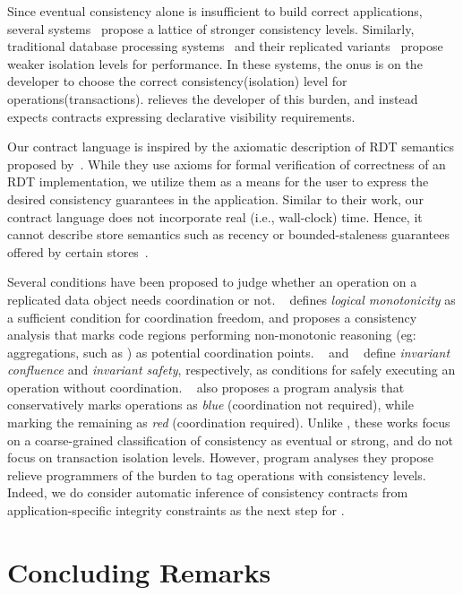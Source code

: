 Since eventual consistency alone is insufficient to build correct applications,
several systems~\cite{Bayou,Terry2013,RedBlue} propose a lattice of stronger
consistency levels. Similarly, traditional database processing
systems~\cite{Berenson95} and their replicated variants~\cite{BailisHAT}
propose weaker isolation levels for performance. In these systems, the onus is
on the developer to choose the correct consistency(isolation) level for
operations(transactions). \quelea relieves the developer of this burden, and
instead expects contracts expressing declarative visibility requirements.

Our contract language is inspired by the axiomatic description of RDT semantics
proposed by~\cite{Burckhardt2014}. While they use axioms for formal
verification of correctness of an RDT implementation, we utilize them as a
means for the user to express the desired consistency guarantees in the
application. Similar to their work, our contract language does not incorporate
real (i.e., wall-clock) time. Hence, it cannot describe store semantics such as
recency or bounded-staleness guarantees offered by certain
stores~\cite{Terry2013}.

Several conditions have been proposed to judge whether an operation on a
replicated data object needs coordination or not. ~\cite{Calm} defines
\emph{logical monotonicity} as a sufficient condition for coordination freedom,
and proposes a consistency analysis that marks code regions performing
non-monotonic reasoning (eg: aggregations, such as ) as potential
coordination points.  ~\cite{IConfluence} and ~\cite{Sieve} define
\emph{invariant confluence} and \emph{invariant safety}, respectively, as
conditions for safely executing an operation without coordination. ~\cite{Sieve}
also proposes a program analysis that conservatively marks operations as
\emph{blue} (coordination not required), while marking the remaining as
\emph{red} (coordination required). Unlike \quelea, these works focus on a
coarse-grained classification of consistency as eventual or strong, and do not
focus on transaction isolation levels. However, program analyses they propose
relieve programmers of the burden to tag operations with consistency levels.
Indeed, we do consider automatic inference of consistency contracts from
application-specific integrity constraints as the next step for \quelea.

\section{Concluding Remarks}
\label{q_sec:concl}

